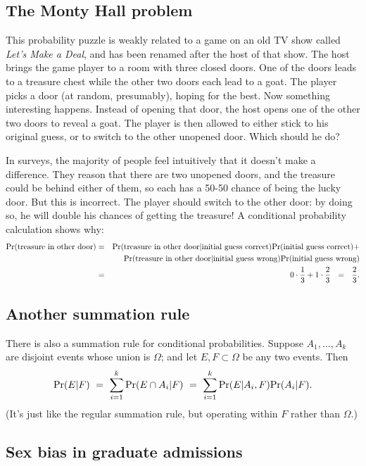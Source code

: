 \documentclass{report}
\theoremstyle{plain}
\theoremstyle{definition}
\newcommand{\pr}{\mbox{\rm Pr}}
\begin{document}
\subsection{The Monty Hall problem}

This probability puzzle is weakly related to a game on an old TV show called {\it Let's Make a Deal}, and has been renamed after the host of that show. The host brings the game player to a room with three closed doors. One of the doors leads to a treasure chest while the other two doors each lead to a goat. The player picks a door (at random, presumably), hoping for the best. Now something interesting happens. Instead of opening that door, the host opens one of the other two doors to reveal a goat. The player is then allowed to either stick to his original guess, or to switch to the other unopened door. Which should he do?

In surveys, the majority of people feel intuitively that it doesn't make a difference. They reason that there are two unopened doors, and the treasure could be behind either of them, so each has a 50-50 chance of being the lucky door. But this is incorrect. The player should switch to the other door: by doing so, he will double his chances of getting the treasure! A conditional probability calculation shows why:
\begin{eqnarray*}
\pr(\mbox{treasure in other door}) 
& = & 
\pr(\mbox{treasure in other door} | \mbox{initial guess correct}) \pr(\mbox{initial guess correct}) + \\
& & \pr(\mbox{treasure in other door} | \mbox{initial guess wrong}) \pr(\mbox{initial guess wrong}) \\
& = & 
0 \cdot \frac{1}{3} + 1 \cdot \frac{2}{3} 
\ \ = \ \ 
\frac{2}{3} .
\end{eqnarray*}

\subsection{Another summation rule}

There is also a summation rule for conditional probabilities. Suppose $A_1, \ldots, A_k$ are disjoint events whose union is $\Omega$; and let $E,F \subset \Omega$ be any two events. Then
$$ \pr(E | F) 
\ = \ 
\sum_{i=1}^k \pr(E \cap A_i | F) 
\ = \ 
\sum_{i=1}^k \pr(E | A_i, F) \pr(A_i|F).
$$
(It's just like the regular summation rule, but operating within $F$ rather than $\Omega$.)

\subsection{Sex bias in graduate admissions}
\end{document}
